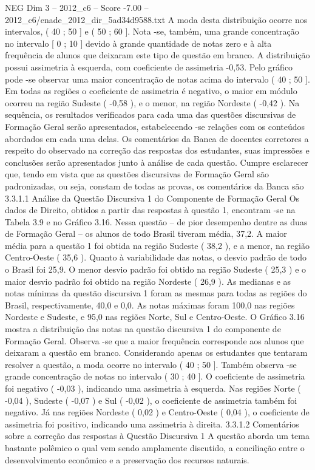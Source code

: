 \begin{textsample}{NEG Dim 3 – 2012\_c6 – Score -7.00 – 2012\_c6/enade\_2012\_dir\_5ad34d9588.txt}
A moda desta distribuição ocorre nos intervalos, ( 40 ; 50 ] e ( 50 ; 60 ].
Nota -se, também, uma grande concentração no intervalo [ 0 ; 10 ] devido à grande quantidade de notas zero e à alta frequência de alunos que deixaram este tipo de questão em branco.
A distribuição possui assimetria à esquerda, com coeficiente de assimetria -0,53.
Pelo gráfico pode -se observar uma maior concentração de notas acima do intervalo ( 40 ; 50 ].
Em todas as regiões o coeficiente de assimetria é negativo, o maior em módulo ocorreu na região Sudeste ( -0,58 ), e o menor, na região Nordeste ( -0,42 ).
Na sequência, os resultados verificados para cada uma das questões discursivas de Formação Geral serão apresentados, estabelecendo -se relações com os conteúdos abordados em cada uma delas.
Os comentários da Banca de docentes corretores a respeito do observado na correção das respostas dos estudantes, suas impressões e conclusões serão apresentados junto à análise de cada questão.
Cumpre esclarecer que, tendo em vista que as questões discursivas de Formação Geral são padronizadas, ou seja, constam de todas as provas, os comentários da Banca são 3.3.1.1 Análise da Questão Discursiva 1 do Componente de Formação Geral Os dados de Direito, obtidos a partir das respostas à questão 1, encontram -se na Tabela 3.9 e no Gráfico 3.16.
Nessa questão – de pior desempenho dentre as duas de Formação Geral – os alunos de todo Brasil tiveram média, 37,2.
A maior média para a questão 1 foi obtida na região Sudeste ( 38,2 ), e a menor, na região Centro-Oeste ( 35,6 ).
Quanto à variabilidade das notas, o desvio padrão de todo o Brasil foi 25,9.
O menor desvio padrão foi obtido na região Sudeste ( 25,3 ) e o maior desvio padrão foi obtido na região Nordeste ( 26,9 ).
As medianas e as notas mínimas da questão discursiva 1 foram as mesmas para todas as regiões do Brasil, respectivamente, 40,0 e 0,0.
As notas máximas foram 100,0 nas regiões Nordeste e Sudeste, e 95,0 nas regiões Norte, Sul e Centro-Oeste.
O Gráfico 3.16 mostra a distribuição das notas na questão discursiva 1 do componente de Formação Geral.
Observa -se que a maior frequência corresponde aos alunos que deixaram a questão em branco.
Considerando apenas os estudantes que tentaram resolver a questão, a moda ocorre no intervalo ( 40 ; 50 ].
Também observa -se grande concentração de notas no intervalo ( 30 ; 40 ].
O coeficiente de assimetria foi negativo ( -0,03 ), indicando uma assimetria à esquerda.
Nas regiões Norte ( -0,04 ), Sudeste ( -0,07 ) e Sul ( -0,02 ), o coeficiente de assimetria também foi negativo.
Já nas regiões Nordeste ( 0,02 ) e Centro-Oeste ( 0,04 ), o coeficiente de assimetria foi positivo, indicando uma assimetria à direita. 3.3.1.2 Comentários sobre a correção das respostas à Questão Discursiva 1 A questão aborda um tema bastante polêmico o qual vem sendo amplamente discutido, a conciliação entre o desenvolvimento econômico e a preservação dos recursos naturais.

\end{textsample}
